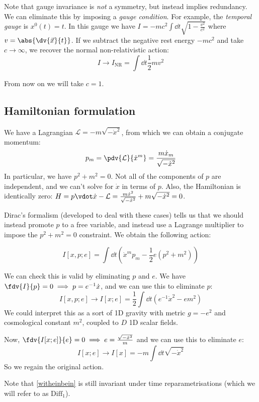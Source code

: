 \documentclass{jknotes}
\begin{document}
Note that gauge invariance is \emph{not} a symmetry, but instead implies redundancy. We can eliminate this by imposing a \emph{gauge condition}. For example, the \emph{temporal gauge} is \(x^0(t) = t\). In this gauge we have \(I = -mc^2\int\dd{t}\sqrt{1 - \frac{v^2}{c^2}}\) where \(v = \abs{\dv{\vec{x}}{t}}\). If we subtract the negative rest energy \(-mc^2\) and take \(c\rightarrow\infty\), we recover the normal non-relativistic action:
\begin{equation}
    I \rightarrow I_{\text{NR}} = \int\dd{t} \frac{1}{2}mv^2
\end{equation}

From now on we will take \(c = 1\).

\subsection{Hamiltonian formulation}
We have a Lagrangian \(\mathcal{L} = -m \sqrt{-\dot{x}^2}\), from which we can obtain a conjugate momentum:
\begin{equation}
    p_m = \pdv{\mathcal{L}}{\dot{x}^m} = \frac{m\dot{x}_m}{\sqrt{-\dot{x}^2}}
\end{equation}
In particular, we have \(p^2+m^2 = 0\). Not all of the components of \(p\) are independent, and we can't solve for \(\dot{x}\) in terms of \(p\). Also, the Hamiltonian is identically zero: \(H = p\vdot\dot{x}-\mathcal{L} = \frac{m\dot{x}^2}{\sqrt{-\dot{x}^2}} + m\sqrt{-\dot{x}^2} = 0\). 

Dirac's formalism (developed to deal with these cases) tells us that we should instead promote \(p\) to a free variable, and instead use a Lagrange multiplier to impose the \(p^2+m^2 = 0\) constraint. We obtain the following action:

\begin{equation}
    I[x,p;e] = \int\dd{t}\left( \dot{x}^mp_m - \frac{1}{2}e(p^2+m^2) \right)
    \tag{\(*\)}
    \label{witheinbein}
\end{equation}

We can check this is valid by eliminating \(p\) and \(e\). We have \(\fdv{I}{p}=0 \implies p = e^{-1}\dot{x}\), and we can use this to eliminate \(p\):
\begin{equation}
    I[x,p;e] \rightarrow I[x;e] = \frac{1}{2}\int\dd{t}\left( e^{-1}\dot{x}^2 - em^2 \right)
\end{equation}
We could interpret this as a sort of 1D gravity with metric \(g = -e^2\) and cosmological constant \(m^2\), coupled to \(D\) 1D scalar fields.

Now, \(\fdv{I[x;e]}{e} = 0 \implies e = \frac{\sqrt{-\dot{x}^2}}{m}\) and we can use this to eliminate \(e\):
\begin{equation}
    I[x;e] \rightarrow I[x] = -m\int\dd{t}\sqrt{-\dot{x}^2}
\end{equation}
So we regain the original action.

Note that \eqref{witheinbein} is still invariant under time reparametrisations (which we will refer to as \(\text{Diff}_1\)).
\end{document}
